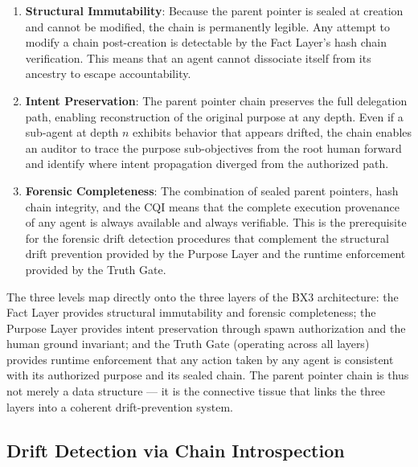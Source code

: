 \begin{enumerate}
    \item \textbf{Structural Immutability}: Because the parent pointer is sealed at creation and cannot be modified, the chain is permanently legible. Any attempt to modify a chain post-creation is detectable by the Fact Layer's hash chain verification. This means that an agent cannot dissociate itself from its ancestry to escape accountability.

    \item \textbf{Intent Preservation}: The parent pointer chain preserves the full delegation path, enabling reconstruction of the original purpose at any depth. Even if a sub-agent at depth $n$ exhibits behavior that appears drifted, the chain enables an auditor to trace the purpose sub-objectives from the root human forward and identify where intent propagation diverged from the authorized path.

    \item \textbf{Forensic Completeness}: The combination of sealed parent pointers, hash chain integrity, and the CQI means that the complete execution provenance of any agent is always available and always verifiable. This is the prerequisite for the forensic drift detection procedures that complement the structural drift prevention provided by the Purpose Layer and the runtime enforcement provided by the Truth Gate.
\end{enumerate}

The three levels map directly onto the three layers of the BX3 architecture: the Fact Layer provides structural immutability and forensic completeness; the Purpose Layer provides intent preservation through spawn authorization and the human ground invariant; and the Truth Gate (operating across all layers) provides runtime enforcement that any action taken by any agent is consistent with its authorized purpose and its sealed chain. The parent pointer chain is thus not merely a data structure — it is the connective tissue that links the three layers into a coherent drift-prevention system.

\subsection{Drift Detection via Chain Introspection}
\label{sec:drift_detection}

